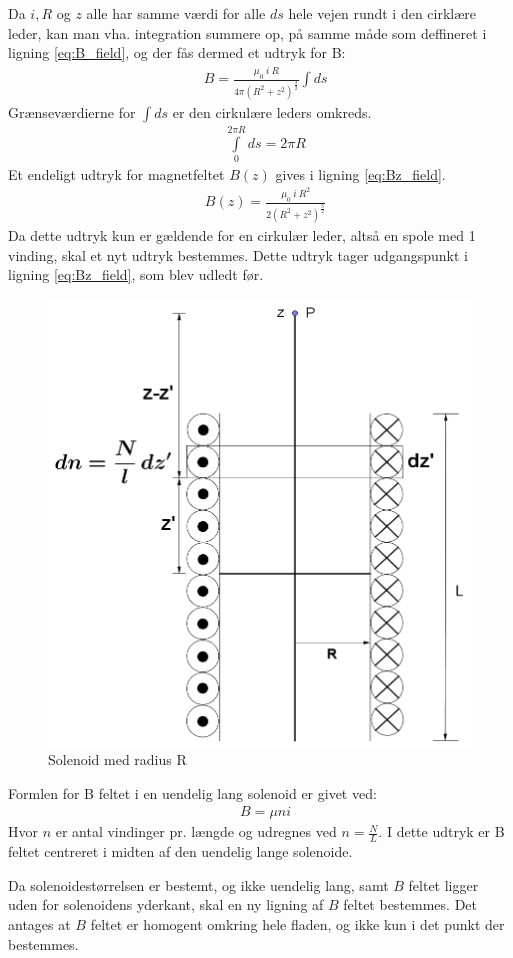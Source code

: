 Da $i, R$ og $z$ alle har samme værdi for alle $ds$ hele vejen rundt i den cirklære leder, kan man vha. integration summere op, på samme måde som deffineret i ligning \ref{eq:B_field}, og der fås dermed et udtryk for B:
\begin{align}
&B=\frac{\mu_0 \: i \: R}{4\pi(R^2+z^2)^\frac{3}{2}}\int ds
\end{align}
Grænseværdierne for $\int ds$ er den cirkulære leders omkreds.
\begin{align}
&\int\limits_{0}^{2\pi R} ds = 2\pi R
\end{align}
Et endeligt udtryk for magnetfeltet $B(z)$ gives i ligning \ref{eq:Bz_field}.
\begin{align}
	&B(z)=\frac{\mu_0 \: i \: R^2}{2(R^2+z^2)^\frac{3}{2}} \label{eq:Bz_field}
\end{align}
Da dette udtryk kun er gældende for en cirkulær leder, altså en spole med 1 vinding, skal et nyt udtryk bestemmes. Dette udtryk tager udgangspunkt i ligning \ref{eq:Bz_field}, som blev udledt før.
\begin{figure}[h!]
	\centering
	\includegraphics[width=.7\textwidth]{billeder/B_felt2.png}
	\caption{Solenoid med radius R}
	\label{fig:spole_fig2}
\end{figure}
Formlen for B feltet i en uendelig lang solenoid er givet ved:
\begin{align}
	&B=\mu ni
\end{align}
Hvor $n$ er antal vindinger pr. længde og udregnes ved $n=\frac{N}{L}$.
I dette udtryk er B feltet centreret i midten af den uendelig lange solenoide.

Da solenoidestørrelsen er bestemt, og ikke uendelig lang, samt $B$ feltet ligger uden for solenoidens yderkant, skal en ny ligning af $B$ feltet bestemmes.
Det antages at $B$ feltet er homogent omkring hele fladen, og ikke kun i det punkt der bestemmes.


